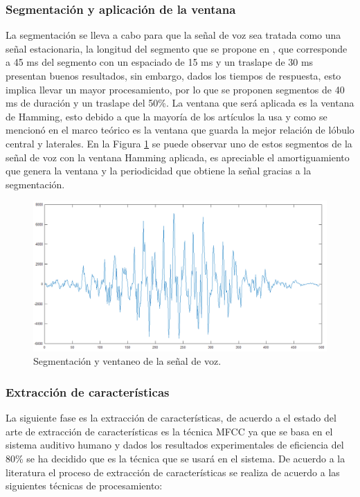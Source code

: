 	\subsubsection*{Segmentación y aplicación de la ventana}
	
	La segmentación se lleva a cabo para que la señal de voz sea tratada como una señal estacionaria, la longitud del segmento que se propone en \cite{A6}, que corresponde a 45 ms del segmento con un espaciado de 15 ms y un traslape de 30 ms presentan buenos resultados, sin embargo, dados los tiempos de respuesta, esto implica llevar un mayor procesamiento, por lo que se proponen segmentos de 40 ms de duración y un traslape del 50\%. La ventana que será aplicada es la ventana de Hamming, esto debido a que la mayoría de los artículos la usa y como se mencionó en el marco teórico es la ventana que guarda la mejor relación de lóbulo central y laterales. En la Figura \ref{fig:ana:windowing} se puede observar uno de estos segmentos de la señal de voz con la ventana Hamming aplicada, es apreciable el amortiguamiento que genera la ventana y la periodicidad que obtiene la señal gracias a la segmentación.
	
	 \begin{figure}[H]
			\centering
			\includegraphics[width=0.8\linewidth]{figures/windowing}
			\caption{Segmentación y ventaneo de la señal de voz.}
			\label{fig:ana:windowing}
	\end{figure}
	
	\subsubsection*{Extracción de características}
	
	La siguiente fase es la extracción de características, de acuerdo a \cite{A1} el estado del arte de extracción de características es la técnica MFCC ya que se basa en el sistema auditivo humano y dados los resultados experimentales de eficiencia del 80\% se ha decidido que es la técnica que se usará en el sistema. De acuerdo a la literatura el proceso de extracción de características se realiza de acuerdo a las siguientes técnicas de procesamiento:
	
